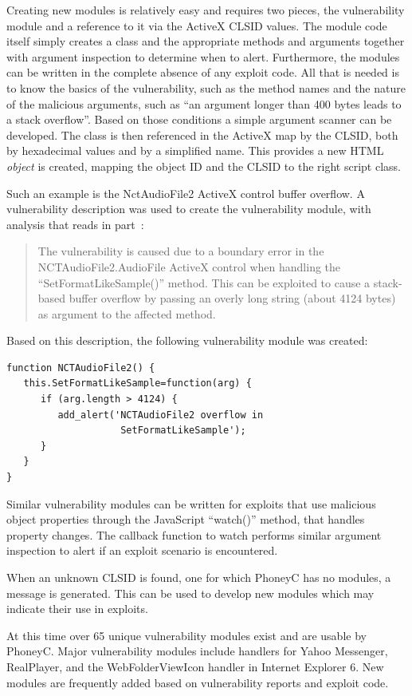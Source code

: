 \documentclass[10pt,twocolumn]{article}
\begin{document}
Creating new modules is relatively easy and requires two pieces, the vulnerability module and a reference to it via the ActiveX CLSID values. The module code itself simply creates a class and the appropriate methods and arguments together with argument inspection to determine when to alert. Furthermore, the modules can be written in the complete absence of any exploit code. All that is needed is to know the basics of the vulnerability, such as the method names and the nature of the malicious arguments, such as ``an argument longer than 400 bytes leads to a stack overflow''. Based on those conditions a simple argument scanner can be developed. The class is then referenced in the ActiveX map by the CLSID, both by hexadecimal values and by a simplified name. This provides a new HTML {\em object} is created, mapping the object ID and the CLSID to the right script class. 

Such an example is the NctAudioFile2 ActiveX control buffer overflow. A vulnerability description was used to create the vulnerability module, with analysis that reads in part~\cite{secunia:nctaudiofile}:
\begin{quote}
The vulnerability is caused due to a boundary error in the NCTAudioFile2.AudioFile ActiveX control when handling the ``SetFormatLikeSample()'' method. This can be exploited to cause a stack-based buffer overflow by passing an overly long string (about 4124 bytes) as argument to the affected method.
\end{quote}
Based on this description, the following vulnerability module was created:
\scriptsize
\begin{verbatim}
function NCTAudioFile2() {
   this.SetFormatLikeSample=function(arg) {
      if (arg.length > 4124) {
         add_alert('NCTAudioFile2 overflow in 
                    SetFormatLikeSample');
      }
   }
}
\end{verbatim}
\normalsize
Similar vulnerability modules can be written for exploits that use malicious object properties through the JavaScript ``watch()'' method, that handles property changes. The callback function to watch performs similar argument inspection to alert if an exploit scenario is encountered.

When an unknown CLSID is found, one for which PhoneyC has no modules, a message is generated. This can be used to develop new modules which may indicate their use in exploits. 

At this time over 65 unique vulnerability modules exist and are usable by PhoneyC. Major vulnerability modules include handlers for Yahoo Messenger, RealPlayer, and the WebFolderViewIcon handler in Internet Explorer 6. New modules are frequently added based on vulnerability reports and exploit code. 
\end{document}
